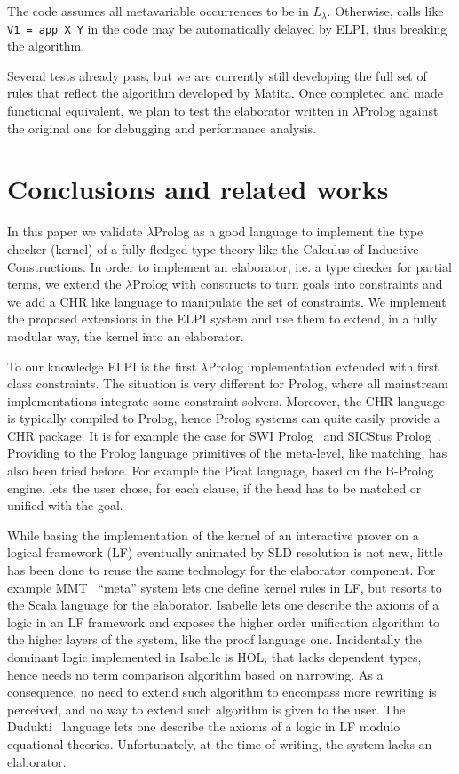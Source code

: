 \documentclass{easychair}
\begin{document}
The code assumes all metavariable occurrences to be in $L_\lambda$. Otherwise, calls like \verb+V1 = app X Y+ in the code may be automatically delayed by ELPI, thus breaking the algorithm.

Several tests already pass, but we are currently still developing the full set of rules that reflect the algorithm developed by Matita. Once completed and made functional equivalent, we plan to test the elaborator written in $\lambda$Prolog against the original one for debugging and performance analysis.

\section{Conclusions and related works}\label{sec:conclusion}

In this paper we validate $\lambda$Prolog as a good language to implement
the type checker (kernel) of a fully fledged type theory like the Calculus of
Inductive Constructions.  In order to implement an elaborator, i.e. a type
checker for partial terms, we extend the $\lambda$Prolog with constructs to
turn goals into constraints and we add a CHR like language to manipulate
the set of constraints.  We implement the proposed extensions in the ELPI
system and use them to extend, in a fully modular way, the kernel into
an elaborator.

To our knowledge ELPI is the first $\lambda$Prolog implementation extended
with first class constraints.  The situation is very different for Prolog, where all
mainstream implementations integrate some constraint solvers.  Moreover,
the CHR language is typically compiled to Prolog, hence Prolog systems
can quite easily provide a CHR package.  It is for example the case for
SWI Prolog~\cite{SWI} and SICStus Prolog~\cite{SICStus}.  Providing to
the Prolog language primitives of the meta-level, like matching, has also
been tried before.  For example the Picat language, based on the
B-Prolog~\cite{Bprolog} engine, lets the user chose, for each clause,
if the head has to be matched or unified with the goal.

While basing the implementation of the kernel of an interactive prover on a
logical framework (LF) eventually animated by SLD resolution is not new, 
little has been done to reuse the same technology for the elaborator
component.  For example MMT~\cite{mmt} ``meta'' system lets one define kernel
rules in LF, but resorts to the Scala language for the elaborator.
Isabelle lets one describe the axioms of a logic in an LF framework and
exposes the higher order unification algorithm to the higher layers of
the system, like the proof language one.  Incidentally the dominant
logic implemented in Isabelle is HOL, that lacks dependent types, hence
needs no term comparison algorithm based on narrowing.  As a consequence,
no need to extend such algorithm to encompass more rewriting is perceived,
and no way to extend such algorithm is given to the user.
The Dudukti~\cite{dedukti} language lets one describe the axioms of a logic
in LF modulo equational theories.  Unfortunately, at the time of writing,
the system lacks an elaborator.
\end{document}
